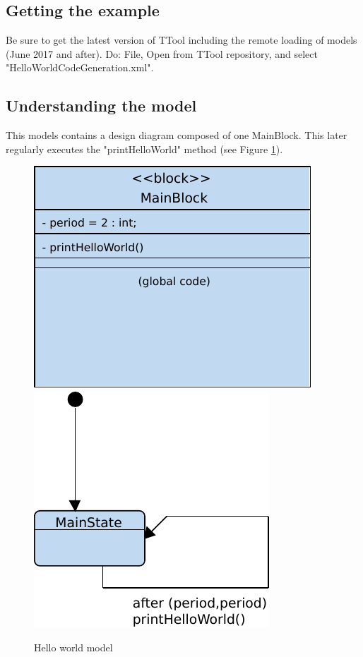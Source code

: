 \documentclass[12pt]{article}
\begin{document}
\subsection{Getting the example}
Be sure to get the latest version of TTool including the remote loading of models (June 2017 and after). Do: File, Open from TTool repository, and select "HelloWorldCodeGeneration.xml".

\subsection{Understanding the model}
This models contains a design diagram composed of one MainBlock. This later regularly executes the "printHelloWorld" method (see Figure \ref{fig:printhelloworld}).


\begin{figure}[htbp]
\centering
\includegraphics[scale=0.65]{figures/bdhelloworld.pdf}
\hspace{1cm}
\includegraphics[scale=0.65]{figures/smdhelloworld.pdf}
\caption{Hello world model} \label{fig:printhelloworld}
\end{figure}
\end{document}
